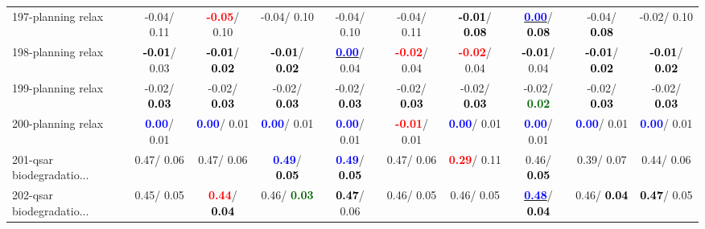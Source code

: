 \begin{table}[h]
\begin{center}
{\begin{tabular}{lc|c|c|c|c|c|c|c|c}
197-planning relax &  -0.04/  0.11 & \textcolor{red}{\textbf{ -0.05}}/  0.10 &  -0.04/  0.10 &  -0.04/  0.10 &  -0.04/  0.11 & \textcolor{black}{\textbf{ -0.01}}/\textcolor{black}{\textbf{  0.08}} & \underline{\textcolor{blue}{\textbf{  0.00}}}/\textcolor{black}{\textbf{  0.08}} &  -0.04/\textcolor{black}{\textbf{  0.08}} &  -0.02/  0.10 \\
198-planning relax & \textcolor{black}{\textbf{ -0.01}}/  0.03 & \textcolor{black}{\textbf{ -0.01}}/\textcolor{black}{\textbf{  0.02}} & \textcolor{black}{\textbf{ -0.01}}/\textcolor{black}{\textbf{  0.02}} & \underline{\textcolor{blue}{\textbf{  0.00}}}/  0.04 & \textcolor{red}{\textbf{ -0.02}}/  0.04 & \textcolor{red}{\textbf{ -0.02}}/  0.04 & \textcolor{black}{\textbf{ -0.01}}/  0.04 & \textcolor{black}{\textbf{ -0.01}}/\textcolor{black}{\textbf{  0.02}} & \textcolor{black}{\textbf{ -0.01}}/\textcolor{black}{\textbf{  0.02}} \\
199-planning relax &  -0.02/\textcolor{black}{\textbf{  0.03}} &  -0.02/\textcolor{black}{\textbf{  0.03}} &  -0.02/\textcolor{black}{\textbf{  0.03}} &  -0.02/\textcolor{black}{\textbf{  0.03}} &  -0.02/\textcolor{black}{\textbf{  0.03}} &  -0.02/\textcolor{black}{\textbf{  0.03}} &  -0.02/\textcolor{darkgreen}{\textbf{  0.02}} &  -0.02/\textcolor{black}{\textbf{  0.03}} &  -0.02/\textcolor{black}{\textbf{  0.03}} \\ \hline
200-planning relax & \textcolor{blue}{\textbf{  0.00}}/  0.01 & \textcolor{blue}{\textbf{  0.00}}/  0.01 & \textcolor{blue}{\textbf{  0.00}}/  0.01 & \textcolor{blue}{\textbf{  0.00}}/  0.01 & \textcolor{red}{\textbf{ -0.01}}/  0.01 & \textcolor{blue}{\textbf{  0.00}}/  0.01 & \textcolor{blue}{\textbf{  0.00}}/  0.01 & \textcolor{blue}{\textbf{  0.00}}/  0.01 & \textcolor{blue}{\textbf{  0.00}}/  0.01 \\
201-qsar biodegradatio... &   0.47/  0.06 &   0.47/  0.06 & \textcolor{blue}{\textbf{  0.49}}/\textcolor{black}{\textbf{  0.05}} & \textcolor{blue}{\textbf{  0.49}}/\textcolor{black}{\textbf{  0.05}} &   0.47/  0.06 & \textcolor{red}{\textbf{  0.29}}/  0.11 &   0.46/\textcolor{black}{\textbf{  0.05}} &   0.39/  0.07 &   0.44/  0.06 \\
202-qsar biodegradatio... &   0.45/  0.05 & \textcolor{red}{\textbf{  0.44}}/\textcolor{black}{\textbf{  0.04}} &   0.46/\textcolor{darkgreen}{\textbf{  0.03}} & \textcolor{black}{\textbf{  0.47}}/  0.06 &   0.46/  0.05 &   0.46/  0.05 & \underline{\textcolor{blue}{\textbf{  0.48}}}/\textcolor{black}{\textbf{  0.04}} &   0.46/\textcolor{black}{\textbf{  0.04}} & \textcolor{black}{\textbf{  0.47}}/  0.05 \\

\end{tabular}}
\end{center}
\end{table}
